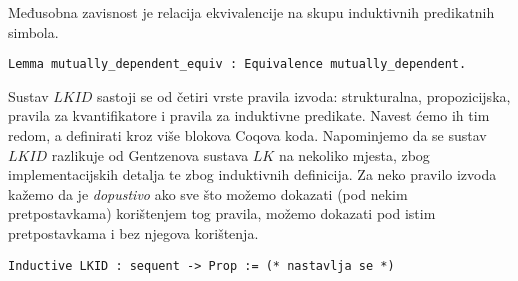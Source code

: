 \begin{lemma}
  Međusobna zavisnost je relacija ekvivalencije na skupu induktivnih predikatnih simbola.
\begin{verbatim}
Lemma mutually_dependent_equiv : Equivalence mutually_dependent.
\end{verbatim}
\end{lemma}

Sustav \(\mathit{LKID}\) sastoji se od četiri vrste pravila izvoda:
strukturalna, propozicijska, pravila za kvantifikatore i pravila za induktivne predikate.
Navest ćemo ih tim redom, a definirati kroz više blokova Coqova koda.
Napominjemo da se sustav \(\mathit{LKID}\) razlikuje od Gentzenova sustava \(\mathit{LK}\)
na nekoliko mjesta, zbog implementacijskih detalja te zbog induktivnih definicija.
Za neko pravilo izvoda kažemo da je \textit{dopustivo} ako
sve što možemo dokazati (pod nekim pretpostavkama)
korištenjem tog pravila, možemo dokazati pod istim pretpostavkama
i bez njegova korištenja.
\begin{verbatim}
Inductive LKID : sequent -> Prop := (* nastavlja se *)
\end{verbatim}

